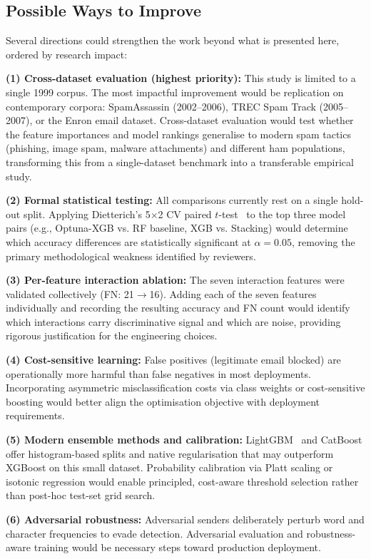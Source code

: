 \documentclass[conference]{IEEEtran}
\begin{document}
\subsection{Possible Ways to Improve}

Several directions could strengthen the work beyond what is presented here, ordered by research impact:

\textbf{(1) Cross-dataset evaluation (highest priority):} This study is limited to a single 1999 corpus. The most impactful improvement would be replication on contemporary corpora: SpamAssassin (2002--2006), TREC Spam Track (2005--2007), or the Enron email dataset. Cross-dataset evaluation would test whether the feature importances and model rankings generalise to modern spam tactics (phishing, image spam, malware attachments) and different ham populations, transforming this from a single-dataset benchmark into a transferable empirical study.

\textbf{(2) Formal statistical testing:} All comparisons currently rest on a single hold-out split. Applying Dietterich's 5$\times$2 CV paired $t$-test~\cite{ref14} to the top three model pairs (e.g., Optuna-XGB vs. RF baseline, XGB vs. Stacking) would determine which accuracy differences are statistically significant at $\alpha=0.05$, removing the primary methodological weakness identified by reviewers.

\textbf{(3) Per-feature interaction ablation:} The seven interaction features were validated collectively (FN: 21$\to$16). Adding each of the seven features individually and recording the resulting accuracy and FN count would identify which interactions carry discriminative signal and which are noise, providing rigorous justification for the engineering choices.

\textbf{(4) Cost-sensitive learning:} False positives (legitimate email blocked) are operationally more harmful than false negatives in most deployments. Incorporating asymmetric misclassification costs via class weights or cost-sensitive boosting would better align the optimisation objective with deployment requirements.

\textbf{(5) Modern ensemble methods and calibration:} LightGBM~\cite{ref13} and CatBoost offer histogram-based splits and native regularisation that may outperform XGBoost on this small dataset. Probability calibration via Platt scaling or isotonic regression would enable principled, cost-aware threshold selection rather than post-hoc test-set grid search.

\textbf{(6) Adversarial robustness:} Adversarial senders deliberately perturb word and character frequencies to evade detection. Adversarial evaluation and robustness-aware training would be necessary steps toward production deployment.
\end{document}
